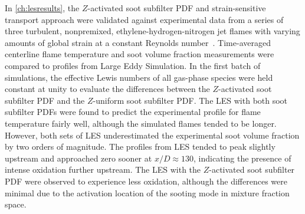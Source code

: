 In \cref{ch:lesresults}, the $Z$-activated soot subfilter PDF and strain-sensitive transport approach were validated against experimental data from a series of three turbulent, nonpremixed, ethylene-hydrogen-nitrogen jet flames with varying amounts of global strain at a constant Reynolds number~\cite{mahmoud2017}. Time-averaged centerline flame temperature and soot volume fraction measurements were compared to profiles from Large Eddy Simulation. In the first batch of simulations, the effective Lewis numbers of all gas-phase species were held constant at unity to evaluate the differences between the $Z$-activated soot subfilter PDF and the $Z$-uniform soot subfilter PDF. The LES with both soot subfilter PDFs were found to predict the experimental profile for flame temperature fairly well, although the simulated flames tended to be longer. However, both sets of LES underestimated the experimental soot volume fraction by two orders of magnitude. The profiles from LES tended to peak slightly upstream and approached zero sooner at $x/D \approx 130$, indicating the presence of intense oxidation further upstream. The LES with the $Z$-activated soot subfilter PDF were observed to experience less oxidation, although the differences were minimal due to the activation location of the sooting mode in mixture fraction space.

